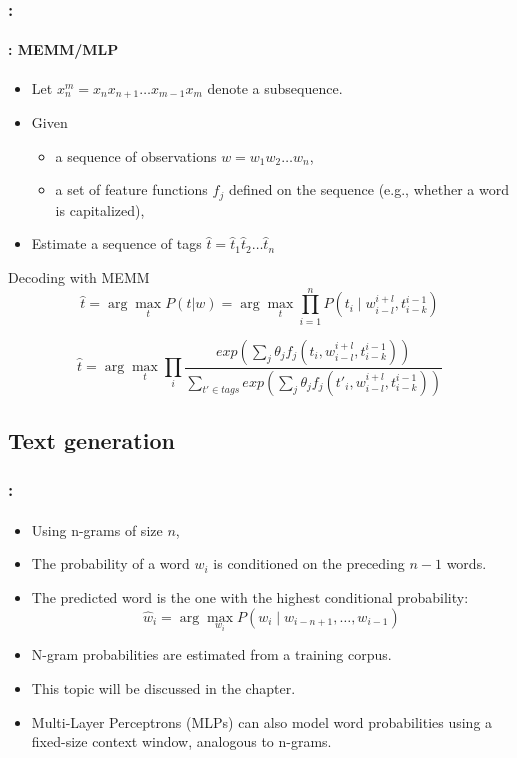 \documentclass[xcolor=table]{beamer}
\begin{document}
\begin{frame}
	\frametitle{\insertshortsubtitle: \insertsection}
	\framesubtitle{\insertsubsection: MEMM/MLP}
	
	\begin{itemize}
			\item Let $x_{n}^{m} = x_n x_{n+1} \ldots x_{m-1} x_m$ denote a subsequence.
			\item Given 
			\begin{itemize}
				\item a sequence of observations $w = w_1 w_2 \ldots w_n$,
				\item a set of feature functions $f_j$ defined on the sequence (e.g., whether a word is capitalized),
			\end{itemize}
			\item Estimate a sequence of tags $\hat{t} = \hat{t}_1 \hat{t}_2 \ldots \hat{t}_n$
		\end{itemize}
	
	\begin{block}{Decoding with MEMM}
			\[
			\hat{t} = \arg\max_t P(t | w) = \arg\max_{t} \prod_{i=1}^{n} P(t_i \mid w_{i-l}^{i+l}, t_{i-k}^{i-1})
			\]
			
			\[
			\hat{t} = \arg\max\limits_t \prod\limits_{i}  
			\frac{exp\left(\sum_j \theta_j f_j(t_i, w_{i-l}^{i+l}, t_{i-k}^{i-1})\right)}%
			{\sum_{t' \in tags} exp\left(\sum_j \theta_j f_j(t'_i, w_{i-l}^{i+l}, t_{i-k}^{i-1})\right)}
			\]
		\end{block}
	
\end{frame}


\subsection{Text generation}

\begin{frame}
	\frametitle{\insertshortsubtitle: \insertsection}
	\framesubtitle{\insertsubsection}
	
	\begin{itemize}
		\item Using n-grams of size \(n\),
		\item The probability of a word \(w_i\) is conditioned on the preceding \(n-1\) words.
		\item The predicted word is the one with the highest conditional probability:
		\[
		\hat{w}_i = \arg\max\limits_{w_i} P(w_i \mid w_{i-n+1}, \dots, w_{i-1})
		\]
		\item N-gram probabilities are estimated from a training corpus.
		\item This topic will be discussed in the  chapter.
		\item Multi-Layer Perceptrons (MLPs) can also model word probabilities using a fixed-size context window, analogous to n-grams.
	\end{itemize}
	
\end{frame}
\end{document}
